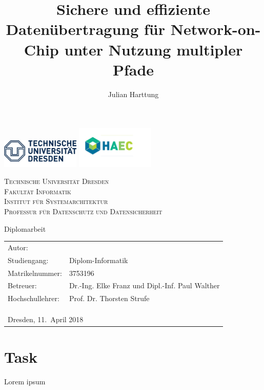 \documentclass[
	paper=a4,
	fontsize=11pt,
	parskip=full %
]{scrreprt}
\author{Julian Harttung}
\title{Sichere und effiziente Datenübertragung für Network-on-Chip unter Nutzung multipler Pfade}
\newcommand{\thesubtitle}{Diplomarbeit}
\newcommand{\theuniversity}{Technische Universität Dresden}
\newcommand{\thefaculty}{Fakultät Informatik}
\newcommand{\theinstitute}{Institut für Systemarchitektur}
\newcommand{\thechair}{Professur für Datenschutz und Datensicherheit}
\begin{document}
    \frenchspacing %
	\begin{titlepage}
		\includegraphics[width=0.28\textwidth]{header_logo_tud}
		\hfill
		\includegraphics[width=0.28\textwidth]{header_logo_haec} %
		\vspace{1.5\baselineskip}
		
		\begin{center}
			\textsc{\theuniversity \\
					\thefaculty \\
					\theinstitute \\
					\thechair}
			\vspace{2.5\baselineskip}
		
			\Huge{\thetitle}
			\vspace{.5\baselineskip}
			
			\LARGE{\thesubtitle}
		\end{center}
		
		\vfill
		
		\begin{tabular}{ll}
			Autor:           & \theauthor \\
			Studiengang:     & Diplom-Informatik \\
			Matrikelnummer:  & 3753196 \\
			Betreuer:        & Dr.-Ing. Elke Franz und Dipl.-Inf. Paul Walther \\
			Hochschullehrer: & Prof. Dr. Thorsten Strufe \\
			\multicolumn{2}{l}{ } \\
			\multicolumn{2}{l}{ } \\
			\multicolumn{2}{l}{ } \\
			\multicolumn{2}{l}{Dresden, 11.\ April 2018} %
		\end{tabular}
	\end{titlepage}
	
	
	
	\chapter*{Task}
    Lorem ipsum
	
\end{document}
